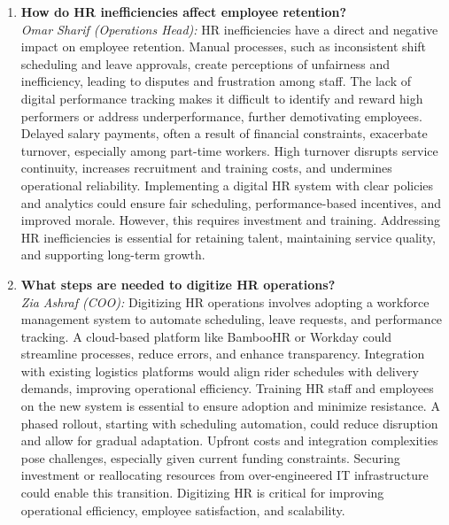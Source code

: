 \documentclass[12pt,a4paper]{article}
\begin{document}
\begin{enumerate}
    \item \textbf{How do HR inefficiencies affect employee retention?} \\
    \textit{Omar Sharif (Operations Head):} HR inefficiencies have a direct and negative impact on employee retention. Manual processes, such as inconsistent shift scheduling and leave approvals, create perceptions of unfairness and inefficiency, leading to disputes and frustration among staff. The lack of digital performance tracking makes it difficult to identify and reward high performers or address underperformance, further demotivating employees. Delayed salary payments, often a result of financial constraints, exacerbate turnover, especially among part-time workers. High turnover disrupts service continuity, increases recruitment and training costs, and undermines operational reliability. Implementing a digital HR system with clear policies and analytics could ensure fair scheduling, performance-based incentives, and improved morale. However, this requires investment and training. Addressing HR inefficiencies is essential for retaining talent, maintaining service quality, and supporting long-term growth.

    \item \textbf{What steps are needed to digitize HR operations?} \\
    \textit{Zia Ashraf (COO):} Digitizing HR operations involves adopting a workforce management system to automate scheduling, leave requests, and performance tracking. A cloud-based platform like BambooHR or Workday could streamline processes, reduce errors, and enhance transparency. Integration with existing logistics platforms would align rider schedules with delivery demands, improving operational efficiency. Training HR staff and employees on the new system is essential to ensure adoption and minimize resistance. A phased rollout, starting with scheduling automation, could reduce disruption and allow for gradual adaptation. Upfront costs and integration complexities pose challenges, especially given current funding constraints. Securing investment or reallocating resources from over-engineered IT infrastructure could enable this transition. Digitizing HR is critical for improving operational efficiency, employee satisfaction, and scalability.


\end{enumerate}
\end{document}
